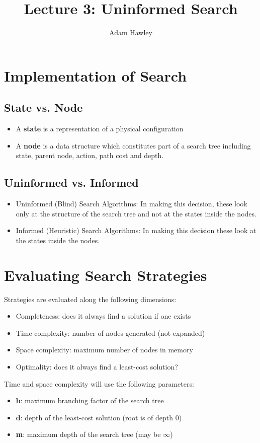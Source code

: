 \documentclass{article}
\title{Lecture 3: Uninformed Search}
\author{Adam Hawley}
\begin{document}
\maketitle
\tableofcontents
\newpage

\section{Implementation of Search}

\subsection{State vs. Node}
\begin{itemize}
	\item A \textbf{state} is a representation of a physical configuration
	\item A \textbf{node} is a data structure which constitutes part of a search tree including state, parent node, action, path cost and depth.
\end{itemize}

\subsection{Uninformed vs. Informed}
\begin{itemize}
	\item Uninformed (Blind) Search Algorithms: In making this decision, these look only at the structure of the search tree and not at the states inside the nodes.
	\item Informed (Heuristic) Search Algorithms: In making this decision these look at the states inside the nodes.
\end{itemize}

\section{Evaluating Search Strategies}
Strategies are evaluated along the following dimensions:
\begin{itemize}
	\item Completeness: does it always find a solution if one exists
	\item Time complexity: number of nodes generated (not expanded)
	\item Space complexity: maximum number of nodes in memory
	\item Optimality: does it always find a least-cost solution?
\end{itemize}
Time and space complexity will use the following parameters:
\begin{itemize}
	\item \textbf{b}: maximum branching factor of the search tree
	\item \textbf{d}: depth of the least-cost solution (root is of depth 0)
	\item \textbf{m}: maximum depth of the search tree (may be $\infty$)
\end{itemize}
\end{document}
